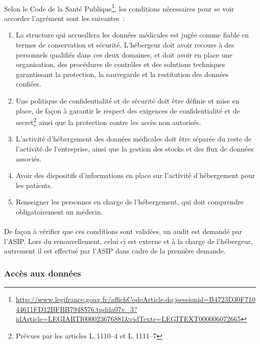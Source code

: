 \paragraph{}
Selon le Code de la Santé
Publique\footnote{\url{http://www.legifrance.gouv.fr/affichCodeArticle.do;jsessionid=B4723D30F71044611FD12BFBB7948576.tpdila07v_3?idArticle=LEGIARTI000023676881&cidTexte=LEGITEXT000006072665}},
les conditions nécessaires pour se voir accorder l'agrément sont les
suivantes~:
\begin{enumerate}
    \item La structure qui accueillera les données médicales est jugée comme
        fiable en termes de conservation et sécurité. L'hébergeur doit avoir
        recours à des personnels qualifiés dans ces deux domaines, et doit
        avoir en place une organisation, des procédures de contrôles et des
        solutions techniques garantissant la protection, la sauvegarde et la
        restitution des données confiées.
    \item Une politique de confidentialité et de sécurité doit être définie et
        mise en place, de façon à garantir le respect des exigences de
        confidentialité et de secret\footnote{Prévues par les articles
        L.\,1110--4 et L.\,1111--7} ainsi que la protection contre les accès
        non autorisés.
    \item L'activité d'hébergement des données médicales doit être séparée du
        reste de l'activité de l'entreprise, ainsi que la gestion des stocks et
        des flux de données associés.
    \item Avoir des dispositifs d'informations en place sur l'activité
        d'hébergement pour les patients.
    \item Renseigner les personnes en charge de l'hébergement, qui doit
        comprendre obligatoirement un médecin.
\end{enumerate}

\paragraph{}
De façon à vérifier que ces conditions sont validées, un audit est demandé par
l'ASIP\@. Lors du renouvellement, celui ci est externe et à la charge de
l'hébergeur, autrement il est effectué par l'ASIP dans cadre de la première
demande.

            \subsubsection{Accès aux données}

